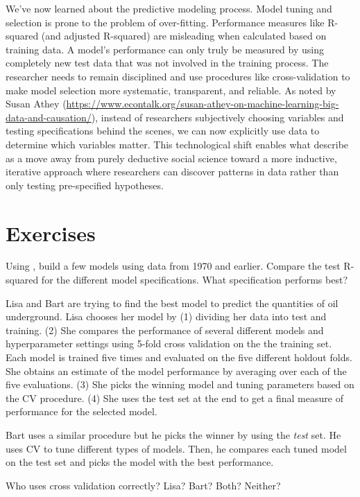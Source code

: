 We've now learned about the predictive modeling process. Model tuning and selection is prone to the problem of over-fitting. Performance measures like R-squared (and adjusted R-squared) are misleading when calculated based on training data. A model's performance can only truly be measured by using completely new test data that was not involved in the training process. The researcher needs to remain disciplined and use procedures like cross-validation to make model selection more systematic, transparent, and reliable. As noted by Susan Athey (\url{https://www.econtalk.org/susan-athey-on-machine-learning-big-data-and-causation/}), instead of researchers subjectively choosing variables and testing specifications behind the scenes, we can now explicitly use data to determine which variables matter. This technological shift enables what \cite{grimmer2021machine} describe as a move away from purely deductive social science toward a more inductive, iterative approach where researchers can discover patterns in data rather than only testing pre-specified hypotheses.

\section{Exercises}

\begin{tcolorbox}[breakable, size=fbox, boxrule=1pt, pad at break*=1mm,colback=cellbackground, colframe=cellborder, title=Exercise: Tufte Model Comparison]
Using , build a few models using data from 1970 and earlier. Compare the test R-squared for the different model specifications. What specification performs best?
\end{tcolorbox}

\begin{tcolorbox}[breakable, size=fbox, boxrule=1pt, pad at break*=1mm,colback=cellbackground, colframe=cellborder, title=Exercise: Cross-Validation Usage]
Lisa and Bart are trying to find the best model to predict the quantities of oil underground. Lisa chooses her model by (1) dividing her data into test and training. (2) She compares the performance of several different models and hyperparameter settings using 5-fold cross validation on the the training set. Each model is trained five times and evaluated on the five different holdout folds. She obtains an estimate of the model performance by averaging over each of the five evaluations. (3) She picks the winning model and tuning parameters based on the CV procedure. (4) She uses the test set at the end to get a final measure of performance for the selected model.

Bart uses a similar procedure but he picks the winner by using the \textit{test} set. He uses CV to tune different types of models. Then, he compares each tuned model on the test set and picks the model with the best performance.

Who uses cross validation correctly? Lisa? Bart? Both? Neither?
\end{tcolorbox}

